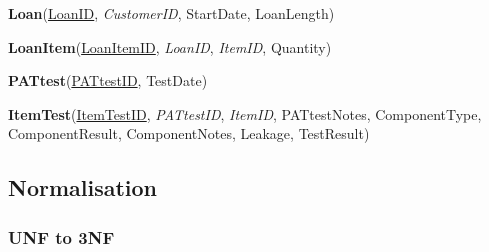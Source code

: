 \noindent \textbf{Loan}(\underline{LoanID}, \emph{CustomerID}, StartDate, LoanLength)

\noindent \textbf{LoanItem}(\underline{LoanItemID}, \emph{LoanID}, \emph{ItemID}, Quantity)

\noindent \textbf{PATtest}(\underline{PATtestID}, TestDate)

\noindent \textbf{ItemTest}(\underline{ItemTestID}, \emph{PATtestID}, \emph{ItemID}, PATtestNotes, ComponentType, ComponentResult, ComponentNotes, Leakage, TestResult)

\subsection{Normalisation}

\subsubsection{UNF to 3NF}

